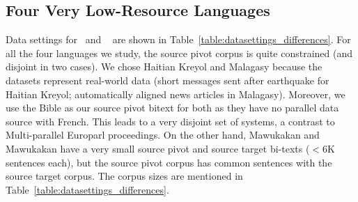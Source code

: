 \documentclass[11pt]{article}
\begin{document}
\subsection{Four Very Low-Resource Languages}
	Data settings for~\cite{Utiyama:07} and ~\cite{Cohn:07} are shown in Table~\ref{table:datasettings_differences}. For all the four languages we study, the source pivot corpus is quite constrained (and disjoint in two cases). We chose Haitian Kreyol and Malagasy because the datasets represent real-world data (short messages sent after earthquake for Haitian Kreyol; automatically aligned news articles in Malagasy). Moreover, we use the Bible as our source pivot bitext for both as they have no parallel data source with French. This leads to a very disjoint set of systems, a contrast to Multi-parallel Europarl proceedings. On the other hand, Mawukakan and Mawukakan have a very small source pivot and source target bi-texts ($<$6K sentences each), but the source pivot corpus has common sentences with the source target corpus. The corpus sizes are mentioned in Table~\ref{table:datasettings_differences}. 
\end{document}
